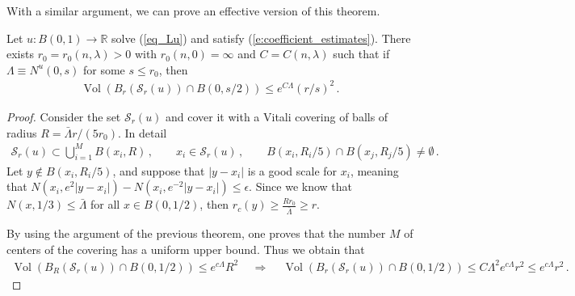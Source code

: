 \documentclass[11pt]{article}
\begin{document}
\begin{appendix}
With a similar argument, we can prove an effective version of this theorem.
\begin{theorem}
Let $u:B(0,1)\to{\mathds{R}}$ solve (\ref{eq_Lu}) and satisfy (\ref{e:coefficient_estimates}). There exists $r_0=r_0(n,\lambda)>0$ with $r_0(n,0)=\infty$ and $C=C(n,\lambda)$ such that if $\Lambda\equiv N^u(0,s)$ for some $s\leq r_0$, then 
 \begin{gather}
  {\operatorname{Vol}}{\left({B_r({\mathcal{S}}_r(u))\cap B(0,s/2)}\right)} \leq e^{C \Lambda}(r/s)^2\, .
 \end{gather}
\end{theorem}
\begin{proof}
Consider the set ${\mathcal{S}}_r(u)$ and cover it with a Vitali covering of balls of radius $R=\bar \Lambda r/(5r_0)$. In detail
 \begin{gather}
  {\mathcal{S}}_r(u)\subset \bigcup_{i=1}^M B(x_i,R) \, , \quad \quad x_i\in {\mathcal{S}}_r(u)\, , \quad \quad B(x_i,R_i/5)\cap B(x_j,R_j/5)\neq \emptyset\, .
 \end{gather}
 Let $y\not \in B(x_i,R_i/5)$, and suppose that ${\left|{y-x_i}\right|}$ is a good scale for $x_i$, meaning that $N(x_i,e^2 {\left|{y-x_i}\right|}) -N(x_i,e^{-2}{\left|{y-x_i}\right|} )\leq \epsilon$. Since we know that $N(x,1/3)\leq \bar \Lambda$ for all $x\in B(0,1/2)$, then $r_c(y)\geq \frac{Rr_0}{\bar \Lambda }\geq r$. 
 
By using the argument of the previous theorem, one proves that the number $M$ of centers of the covering has a uniform upper bound. Thus we obtain that
 \begin{gather}
  {\operatorname{Vol}}{\left({B_{R}({\mathcal{S}}_r(u))\cap B(0,1/2)}\right)} \leq e^{c \Lambda}R^2\, \quad \Longrightarrow \quad \, {\operatorname{Vol}}{\left({B_{r}({\mathcal{S}}_r(u))\cap B(0,1/2)}\right)} \leq C \Lambda^2 e^{c \Lambda}r^2\leq e^{c \Lambda}r^2\, .
 \end{gather}
\end{proof}

\end{appendix}



\end{document}

